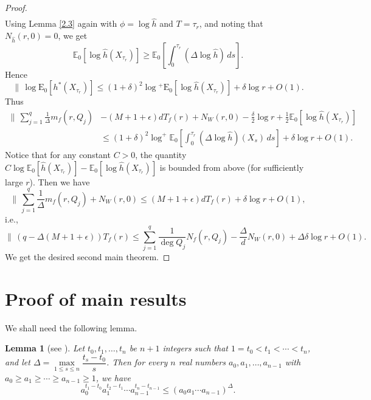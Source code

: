 \documentclass[12pt]{amsart}
\newtheorem{lemma}[theorem]{Lemma}
\newcommand{\bbE}{\mathbb{E}}
\begin{document}
\begin{proof}
\begin{align*}
\end{align*}
Using Lemma \ref{2.3} again with $\phi = \log \hat{h}$ and $T = \tau_r$, and noting that $N_{\hat{h}}(r,0) = 0$, we get
$$
\bbE_0[\log \hat{h}(X_{\tau_r})] \ge\bbE_0 \left[ \int_{0}^{\tau_r} (\Delta \log \hat{h})\, ds \right].
$$
Hence
$$\|\, \log \mathrm{E}_0\left[h^*\left(X_{\tau_r}\right)\right] \leqslant(1+\delta)^2 \log { }^{+} \mathrm{E}_0\left[\log \hat{h}\left(X_{\tau_r}\right)\right]+\delta \log r+O(1).$$
Thus
\begin{align*}
\|\,  \sum_{j=1}^q\frac{1}{\Delta}m_f(r,Q_j)& -(M+1+\epsilon)dT_f(r) + N_W(r,0)-\frac{\delta}{2}\log r+\frac{1}{2}\bbE_0[\log \hat{h}(X_{\tau_r})]\\
&\leq (1+\delta)^2 \log^+ \bbE_0 \left[ \int_{0}^{\tau_r} (\Delta \log \hat{h})(X_s) \, ds \right] + \delta \log r + O(1).
\end{align*}
Notice that for any constant $C>0$, the quantity $C \log \bbE_0[\hat{h}(X_{\tau_r})] - \bbE_0[\log \hat{h}(X_{\tau_r})]$ is bounded from above (for sufficiently large
$r$). Then we have
$$\|\,\sum_{j=1}^q\frac{1}{\Delta}m_f(r,Q_j) + N_W(r,0) \leq (M+1+\epsilon)dT_f(r) + \delta \log r + O(1),$$
i.e.,
$$\|\,(q-\Delta(M+1+\epsilon))T_f(r)\le\sum_{j=1}^q\frac{1}{\deg Q_j}N_f(r,Q_j)-\frac{\Delta}{d}N_W(r,0)+\Delta\delta \log r + O(1).$$
We get the desired second main theorem.
\end{proof}

\section{Proof of main results}

We shall need the following lemma.

\begin{lemma}[{see \cite[Lemma 3.1]{Q21}}]\label{4.1}
Let $t_0,t_1,\ldots,t_n$ be $n+1$ integers such that $1=t_0<t_1<\cdots <t_n$, and let $\Delta =\underset{1\le s\le n}\max\dfrac{t_s-t_0}{s}$. 
Then for every $n$ real numbers $a_0,a_1,\ldots,a_{n-1}$  with $a_0\ge a_1\ge\cdots\ge a_{n-1}\ge 1$, we have
$$ a_0^{t_1-t_0}a_1^{t_2-t_1}\cdots a_{n-1}^{t_{n}-t_{n-1}}\le (a_0a_1\cdots a_{n-1})^{\Delta}.$$
\end{lemma}
\end{document}
